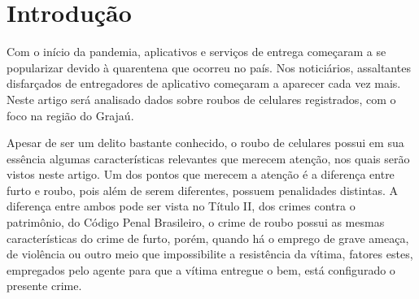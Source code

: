 \section{Introdução}

Com o início da pandemia, aplicativos e serviços de entrega começaram a se 
popularizar devido à quarentena que ocorreu no país. Nos noticiários, 
assaltantes disfarçados de entregadores de aplicativo começaram a 
aparecer cada vez mais. Neste artigo será analisado dados sobre roubos
de celulares registrados, com o foco na região do Grajaú.

Apesar de ser um delito bastante conhecido, o roubo de celulares possui em sua 
essência algumas características relevantes que merecem atenção, nos quais serão
vistos neste artigo. Um dos pontos que merecem a atenção é a diferença entre furto
e roubo, pois além de serem diferentes, possuem penalidades distintas. A diferença 
entre ambos pode ser vista no Título II, dos crimes contra o patrimônio, do Código Penal 
Brasileiro, o crime de roubo possui as mesmas características do crime de furto, 
porém, quando há o emprego de grave ameaça, de violência ou outro meio que 
impossibilite a resistência da vítima, fatores estes, empregados pelo agente para
que a vítima entregue o bem, está configurado o presente crime.